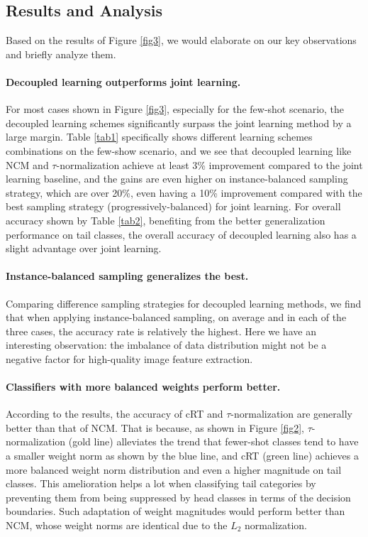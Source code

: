 \documentclass{article}
\begin{document}
\subsection{Results and Analysis}

Based on the results of Figure \ref{fig3}, we would elaborate on our key observations and briefly analyze them.

\paragraph{Decoupled learning outperforms joint learning.}For most cases shown in Figure \ref{fig3}, especially for the few-shot scenario, the decoupled learning schemes significantly surpass the joint learning method by a large margin. Table \ref{tab1} specifically shows different learning schemes combinations on the few-show scenario, and we see that decoupled learning like NCM and $\tau$-normalization achieve at least 3\% improvement compared to the joint learning baseline, and the gains are even higher on instance-balanced sampling strategy, which are over 20\%, even having a 10\% improvement compared with the best sampling strategy (progressively-balanced) for joint learning. For overall accuracy shown by Table \ref{tab2}, benefiting from the better generalization performance on tail classes, the overall accuracy of decoupled learning also has a slight advantage over joint learning.

\paragraph{Instance-balanced sampling generalizes the best.}Comparing difference sampling strategies for decoupled learning methods, we find that when applying instance-balanced sampling, on average and in each of the three cases, the accuracy rate is relatively the highest. Here we have an interesting observation: the imbalance of data distribution might not be a negative factor for high-quality image feature extraction.

\paragraph{Classifiers with more balanced weights perform better.}According to the results, the accuracy of cRT and $\tau$-normalization are generally better than that of NCM. That is because, as shown in Figure \ref{fig2}, $\tau$-normalization (gold line) alleviates the trend that fewer-shot classes tend to have a smaller weight norm as shown by the blue line, and cRT (green line) achieves a more balanced weight norm distribution and even a higher magnitude on tail classes. This amelioration helps a lot when classifying tail categories by preventing them from being suppressed by head classes in terms of the decision boundaries. Such adaptation of weight magnitudes would perform better than NCM, whose weight norms are identical due to the $L_2$ normalization.
\end{document}

